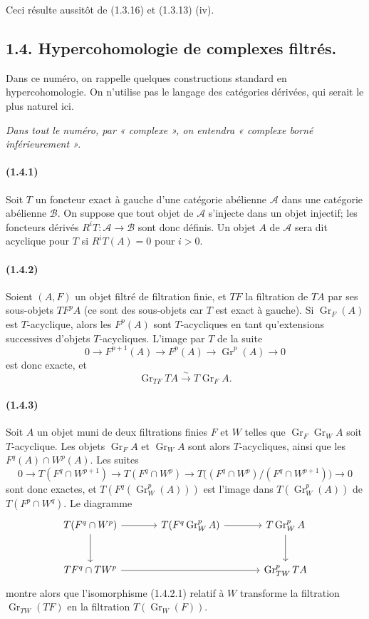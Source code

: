 \documentclass[10pt]{article}
\newcommand{\Gr}{\operatorname{Gr}}
\newcommand{\calA}{\mathcal A}
\newcommand{\calB}{\mathcal B}
\newcommand{\iso}{\xrightarrow{\sim}}
\begin{document}
Ceci résulte aussitôt de (1.3.16) et (1.3.13) (iv).

\subsection*{1.4. Hypercohomologie de complexes filtrés.}

Dans ce numéro, on rappelle quelques constructions standard en hypercohomologie. On n'utilise pas le langage des catégories dérivées, qui serait le plus naturel ici.

\emph{Dans tout le numéro, par « complexe », on entendra « complexe borné inférieurement ».}

\paragraph{(1.4.1)} Soit $T$ un foncteur exact à gauche d'une catégorie abélienne $\calA$ dans une catégorie abélienne $\calB$. On suppose que tout objet de $\calA$ s'injecte dans un objet injectif; les foncteurs dérivés $R^iT:\calA\to\calB$ sont donc définis. Un objet $A$ de $\calA$ sera dit acyclique pour $T$ si $R^iT(A)=0$ pour $i>0$.

\paragraph{(1.4.2)} Soient $(A,F)$ un objet filtré de filtration finie, et $TF$ la filtration de $TA$ par ses sous-objets $TF^pA$ (ce sont des sous-objets car $T$ est exact à gauche). Si $\Gr_F(A)$ est $T$-acyclique, alors les $F^p(A)$ sont $T$-acycliques en tant qu'extensions successives d'objets $T$-acycliques. L'image par $T$ de la suite
\[
0\to F^{p+1}(A)\to F^p(A)\to\Gr^p(A)\to0
\]
est donc exacte, et
\[
\tag{1.4.2.1}
\Gr_{TF}TA\iso T\Gr_FA.
\]

\paragraph{(1.4.3)} Soit $A$ un objet muni de deux filtrations finies $F$ et $W$ telles que $\Gr_F\Gr_WA$ soit $T$-acyclique. Les objets $\Gr_FA$ et $\Gr_WA$ sont alors $T$-acycliques, ainsi que les $F^q(A)\cap W^p(A)$. Les suites
\[
0\to T(F^q\cap W^{p+1})\to T(F^q\cap W^p)\to T\bigl((F^q\cap W^p)/(F^q\cap W^{p+1})\bigr)\to0
\]
sont donc exactes, et $T(F^q(\Gr_W^p(A)))$ est l'image dans $T(\Gr_W^p(A))$ de $T(F^p\cap W^q)$. Le diagramme
\[
\begin{tikzcd}[column sep=large,row sep=large]
T(F^q\cap W^p) \arrow[r] \arrow[d] & T(F^q\Gr_W^pA) \arrow[r] & T\Gr_W^pA \arrow[d]\\
TF^q\cap TW^p \arrow[rr] && \Gr_{TW}^pTA
\end{tikzcd}
\]
montre alors que l'isomorphisme (1.4.2.1) relatif à $W$ transforme la filtration $\Gr_{TW}(TF)$ en la filtration $T(\Gr_W(F))$.
\end{document}
